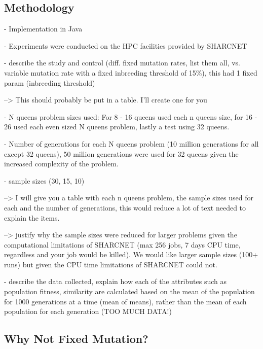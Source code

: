 \documentclass{sig-alternate}
\begin{document}
\subsection{Methodology}

- Implementation in Java

- Experiments were conducted on the HPC facilities provided by SHARCNET

- describe the study and control (diff. fixed mutation rates, list them all, vs.
  variable mutation rate with a fixed inbreeding threshold of 15\%), this had
  1 fixed param (inbreeding threshold)
  
  --> This should probably be put in a table. I'll create one for you


- N queens problem sizes used: For 8 - 16 queens used each n queens size, for
  16 - 26 used each even sized N queens problem, lastly a test using 32 queens.

- Number of generations for each N queens problem (10 million generations for
  all except 32 queens), 50 million generations were used for 32 queens given
  the increased complexity of the problem.

- sample sizes (30, 15, 10)

    --> I will give you a table with each n queens problem, the sample sizes used 
        for each and the number of generations, this would reduce a lot of text
        needed to explain the items.

    --> justify why the sample sizes were reduced for larger problems given the 
        computational limitations of SHARCNET (max 256 jobs, 7 days CPU time, 
        regardless and your job would be killed). We would like larger sample sizes
        (100+ runs) but given the CPU time limitations of SHARCNET could not.

- describe the data collected, explain how each of the attributes such as
  population fitness, similarity are calculated based on the mean of the population
  for 1000 generations at a time (mean of means), rather than the mean of each
  population for each generation (TOO MUCH DATA!)



\subsection{Why Not Fixed Mutation?}
\end{document}
